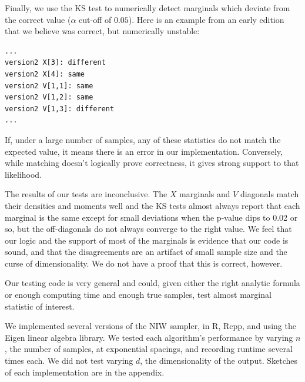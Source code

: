 \documentclass[english]{report}
\begin{document}
Finally, we use the KS test to numerically detect marginals which deviate from the correct value ($\alpha$ cut-off of $0.05$). Here is an example from an early edition that we believe was correct, but numerically unstable:
\begin{verbatim}
...
version2 X[3]: different
version2 X[4]: same
version2 V[1,1]: same
version2 V[1,2]: same
version2 V[1,3]: different
...
\end{verbatim}


If, under a large number of samples, any of these statistics do not match the expected value, it means there is an error in our implementation. Conversely, while matching doesn't logically prove correctness, it gives strong support to that likelihood.

The results of our tests are inconclusive. The $X$ marginals and $V$ diagonals match their densities and moments well and the KS tests almost always report that each marginal is the same except for small deviations when the p-value dips to 0.02 or so, but the off-diagonals do not always converge to the right value. We feel that our logic and the support of most of the marginals is evidence that our code is sound, and that the disagreements are an artifact of small sample size and the curse of dimensionality. We do not have a proof that this is correct, however.

Our testing code is very general and could, given either the right analytic formula or enough computing time and enough true samples, test almost marginal statistic of interest.



We implemented several versions of the NIW sampler, in R, Rcpp, and using the Eigen \cite{RcppEigen} linear algebra library. We tested each algorithm's performance by varying $n$, the number of samples, at exponential spacings, and recording runtime several times each. We did not test varying $d$, the dimensionality of the output. Sketches of each implementation are in the appendix.
\end{document}

